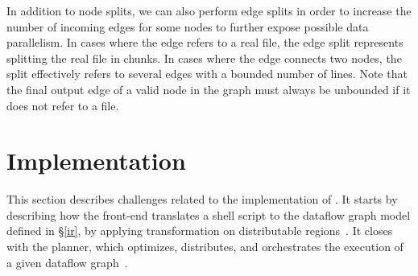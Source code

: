 \documentclass[acmsmall,10pt,review,anonymous]{acmart}
\newcommand{\tr}[1]{} %
\begin{document}
\tr{Remember to mention the assumptions that need to hold for the
  graph transformations to be valid in the Command categories
  section. Commands must be deterministic, they must not do any other
  side effect (such as writing to other files, sending signals,
  etc). However, these assumptions must already be checked when the
  developer designates the categories.}

\tr{If there is time I can work out a formal definition and a proof
  sketch why this transformation preserves the output of the dataflow
  graph.}



In addition to node splits, we can also perform edge splits in order
to increase the number of incoming edges for some nodes to further expose
possible data parallelism. In cases where the edge refers to a real file, the
edge split represents splitting the real file in chunks. In
cases where the edge connects two nodes, the split effectively refers to several edges
with a bounded number of lines. Note that the final output edge of a
valid node in the graph must always be unbounded if it does not refer
to a file.

\section{Implementation}
\label{impl}

This section describes challenges related to the implementation of \sys. 
It starts by describing how the \sys front-end translates a shell script to the dataflow graph model defined in \S\ref{ir}, by applying transformation on distributable regions~.
It closes with the \sys planner, which  optimizes, distributes, and orchestrates the execution of a given dataflow graph~.
\end{document}
